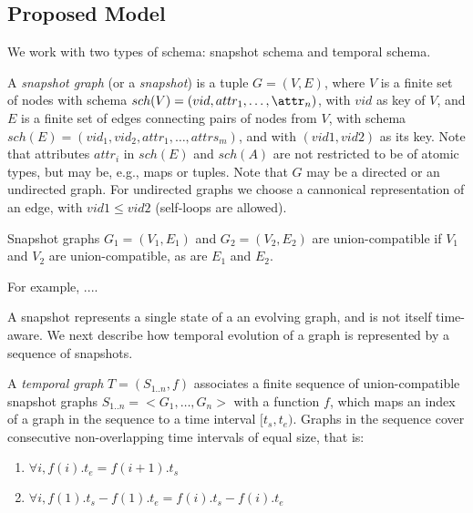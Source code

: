 \documentclass[10pt]{article}
\begin{document}
\begin{itemize}
\section{Proposed Model}


We work with two types of schema: snapshot schema and temporal schema.

\begin{definition}
\label{def:sg}
A {\em snapshot graph} (or a {\em snapshot}) is a tuple $G = (V,E)$,
where $V$ is a finite set of nodes with schema $sch(V)=(vid, attr_1,
\ldots, \attr_n)$, with $vid$ as key of $V$, and $E$ is a finite set
of edges connecting pairs of nodes from $V$, with schema
$sch(E)=(vid_1, vid_2, attr_1, \ldots, attrs_m)$, and with
$(vid1,vid2)$ as its key. Note that attributes $attr_i$ in $sch(E)$
and $sch(A)$ are not restricted to be of atomic types, but may be,
e.g., maps or tuples.  Note that $G$ may be a directed or an
undirected graph.  For undirected graphs we choose a cannonical
representation of an edge, with $vid1 \leq vid2$ (self-loops are
allowed).
\end{definition}

Snapshot graphs $G_1 = (V_1, E_1)$ and $G_2 = (V_2, E_2)$ are
union-compatible if $V_1$ and $V_2$ are union-compatible, as are $E_1$
and $E_2$.

For example, ....

A snapshot represents a single state of a an evolving graph, and is
not itself time-aware.  We next describe how temporal evolution of a
graph is represented by a sequence of snapshots.

\begin{definition}
\label{def:tg}
A {\em temporal graph} $T = (S_{1..n}, f)$ associates a finite
sequence of union-compatible snapshot graphs $S_{1..n} = <G_1, \ldots,
G_n>$ with a function $f$, which maps an index of a graph in the
sequence to a time interval $[t_s, t_e)$.  Graphs in the sequence
  cover consecutive non-overlapping time intervals of equal size, that
  is:

\begin{enumerate}
\item $\forall i, f(i).t_e = f(i+1).t_s$
\item $\forall i, f(1).t_s - f(1).t_e = f(i).t_s - f(i).t_e$  
\end{enumerate}
\end{definition}


\end{itemize}
\end{document}
